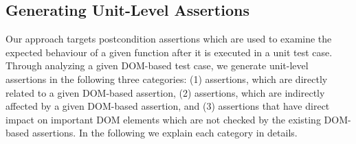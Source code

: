 \subsection{Generating Unit-Level Assertions} \label{Sec:unitLevelAssertion}
Our approach targets postcondition assertions which are used to examine the expected behaviour of a given function after it is executed in a unit test case.
Through analyzing a given DOM-based test case, we generate unit-level assertions in the following three categories: (1) assertions, which are directly related to a given DOM-based assertion, (2) assertions, which are indirectly affected by a given DOM-based assertion, and (3) assertions that have direct impact on important DOM elements which are not checked by the existing DOM-based assertions. In the following we explain each category in details.



 